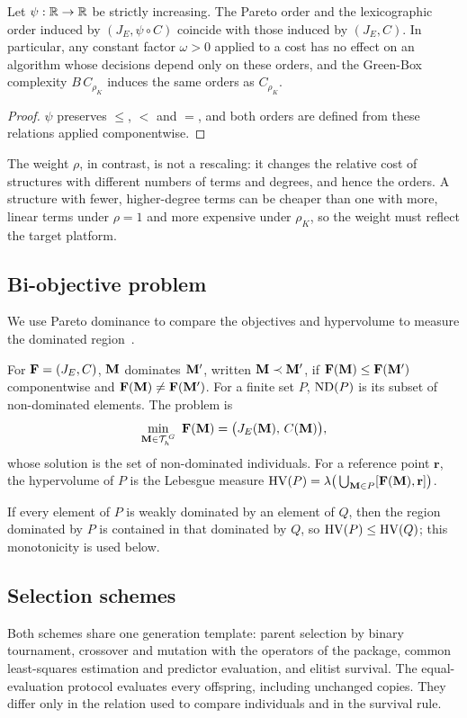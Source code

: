\begin{proposition}\label{prop:rescaling}
Let $\psi:\mathbb{R}\to\mathbb{R}$ be strictly increasing. The Pareto order and the lexicographic order induced by $(J_E,\psi\circ C)$
coincide with those induced by $(J_E,C)$. In particular, any constant factor $\omega>0$ applied to a cost has no effect
on an algorithm whose decisions depend only on these orders, and the Green-Box complexity $B\,C_{\rho_K}$ induces the
same orders as $C_{\rho_K}$.
\end{proposition}
\begin{proof}
$\psi$ preserves $\le$, $<$ and $=$, and both orders are defined from these relations applied componentwise.
\end{proof}

The weight $\rho$, in contrast, is not a rescaling: it changes the relative cost of structures with different numbers of
terms and degrees, and hence the orders. A structure with fewer, higher-degree terms can be cheaper than one with more,
linear terms under $\rho=1$ and more expensive under $\rho_K$, so the weight must reflect the target platform.

\subsection{Bi-objective problem}
We use Pareto dominance to compare the objectives and hypervolume to measure the dominated region~\cite{ZT1999}.

\begin{definition}\label{def:pareto}
For $\mathbf{F}=(J_E,C)$, $\mathbf{M}$ dominates $\mathbf{M}'$, written $\mathbf{M}\prec\mathbf{M}'$, if $\mathbf{F}(\mathbf{M})\le\mathbf{F}(\mathbf{M}')$ componentwise and
$\mathbf{F}(\mathbf{M})\ne\mathbf{F}(\mathbf{M}')$. For a finite set $P$, $\operatorname{ND}(P)$ is its subset of non-dominated elements. The problem is
\begin{equation}
\min_{\M\in\Gen_h^{\,G}}\ \F(\M)=\big(J_E(\M),\,C(\M)\big),
\label{eq:mop}
\end{equation}
whose solution is the set of non-dominated individuals. For a reference point $\mathbf r$, the hypervolume of $P$
is the Lebesgue measure $\operatorname{HV}(P)=\lambda\big(\bigcup_{\mathbf{M}\in P}[\mathbf{F}(\mathbf{M}),\mathbf r]\big)$.
\end{definition}

If every element of $P$ is weakly dominated by an element of $Q$, then the region dominated by $P$ is contained in
that dominated by $Q$, so $\operatorname{HV}(P)\le\operatorname{HV}(Q)$; this monotonicity is used below.

\subsection{Selection schemes}
Both schemes share one generation template: parent selection by binary tournament, crossover and mutation with the
operators of the package, common least-squares estimation and predictor evaluation, and elitist survival. The equal-evaluation protocol evaluates every offspring, including unchanged copies.
They differ only in the relation used to compare individuals and in the survival rule.

